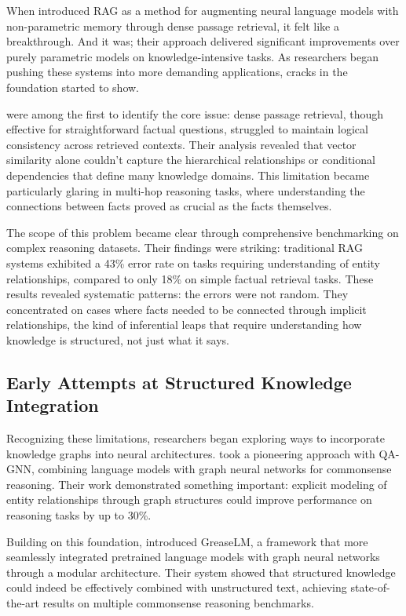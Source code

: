 When \citet{lewis2020retrieval} introduced RAG as a method for augmenting neural language models with non-parametric memory through dense passage retrieval, it felt like a breakthrough. And it was; their approach delivered significant improvements over purely parametric models on knowledge-intensive tasks. As researchers began pushing these systems into more demanding applications, cracks in the foundation started to show.

\citet{karpukhin2020dense} were among the first to identify the core issue: dense passage retrieval, though effective for straightforward factual questions, struggled to maintain logical consistency across retrieved contexts. Their analysis revealed that vector similarity alone couldn't capture the hierarchical relationships or conditional dependencies that define many knowledge domains. This limitation became particularly glaring in multi-hop reasoning tasks, where understanding the connections between facts proved as crucial as the facts themselves.

The scope of this problem became clear through \citet{xiong2021pretrained} comprehensive benchmarking on complex reasoning datasets. Their findings were striking: traditional RAG systems exhibited a 43\% error rate on tasks requiring understanding of entity relationships, compared to only 18\% on simple factual retrieval tasks. These results revealed systematic patterns: the errors were not random. They concentrated on cases where facts needed to be connected through implicit relationships, the kind of inferential leaps that require understanding how knowledge is structured, not just what it says.

\subsection{Early Attempts at Structured Knowledge Integration}

Recognizing these limitations, researchers began exploring ways to incorporate knowledge graphs into neural architectures. \citet{yasunaga2021qagnn} took a pioneering approach with QA-GNN, combining language models with graph neural networks for commonsense reasoning. Their work demonstrated something important: explicit modeling of entity relationships through graph structures could improve performance on reasoning tasks by up to 30\%.

Building on this foundation, \citet{zhang2022grease} introduced GreaseLM, a framework that more seamlessly integrated pretrained language models with graph neural networks through a modular architecture. Their system showed that structured knowledge could indeed be effectively combined with unstructured text, achieving state-of-the-art results on multiple commonsense reasoning benchmarks.


